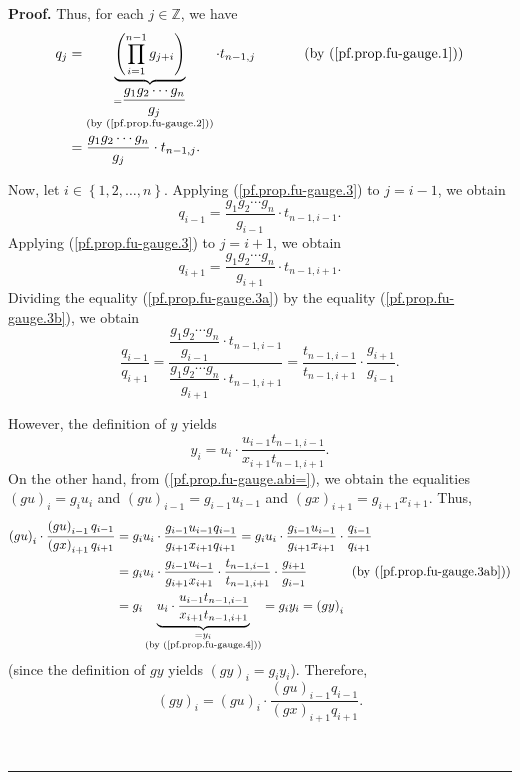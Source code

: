 \documentclass[numbers=enddot,12pt,final,onecolumn,notitlepage]{scrartcl}%
\theoremstyle{definition}
\newenvironment{proof}[1][Proof]{\noindent\textbf{#1.} }{\ \rule{0.5em}{0.5em}}
\let\prodnonlimits\prod
\renewcommand{\prod}{\prodnonlimits\limits}
\newenvironment{verlong}{}{}
\begin{document}
\begin{verlong}
\begin{proof}
Thus, for each $j\in\mathbb{Z}$, we have
\begin{align}
q_{j}  & =\underbrace{\left(  \prod_{i=1}^{n-1}g_{j+i}\right)  }%
_{\substack{=\dfrac{g_{1}g_{2}\cdots g_{n}}{g_{j}}\\\text{(by
(\ref{pf.prop.fu-gauge.2}))}}}\cdot t_{n-1,j}\ \ \ \ \ \ \ \ \ \ \left(
\text{by (\ref{pf.prop.fu-gauge.1})}\right)  \nonumber\\
& =\dfrac{g_{1}g_{2}\cdots g_{n}}{g_{j}}\cdot t_{n-1,j}%
.\label{pf.prop.fu-gauge.3}%
\end{align}


Now, let $i\in\left\{  1,2,\ldots,n\right\}  $. Applying
(\ref{pf.prop.fu-gauge.3}) to $j=i-1$, we obtain%
\begin{equation}
q_{i-1}=\dfrac{g_{1}g_{2}\cdots g_{n}}{g_{i-1}}\cdot t_{n-1,i-1}%
.\label{pf.prop.fu-gauge.3a}%
\end{equation}
Applying (\ref{pf.prop.fu-gauge.3}) to $j=i+1$, we obtain%
\begin{equation}
q_{i+1}=\dfrac{g_{1}g_{2}\cdots g_{n}}{g_{i+1}}\cdot t_{n-1,i+1}%
.\label{pf.prop.fu-gauge.3b}%
\end{equation}
Dividing the equality (\ref{pf.prop.fu-gauge.3a}) by the equality
(\ref{pf.prop.fu-gauge.3b}), we obtain%
\begin{equation}
\dfrac{q_{i-1}}{q_{i+1}}=\dfrac{\dfrac{g_{1}g_{2}\cdots g_{n}}{g_{i-1}}\cdot
t_{n-1,i-1}}{\dfrac{g_{1}g_{2}\cdots g_{n}}{g_{i+1}}\cdot t_{n-1,i+1}}%
=\dfrac{t_{n-1,i-1}}{t_{n-1,i+1}}\cdot\dfrac{g_{i+1}}{g_{i-1}}%
.\label{pf.prop.fu-gauge.3ab}%
\end{equation}


However, the definition of $y$ yields%
\begin{equation}
y_{i}=u_{i}\cdot\dfrac{u_{i-1}t_{n-1,i-1}}{x_{i+1}t_{n-1,i+1}}%
.\label{pf.prop.fu-gauge.4}%
\end{equation}
On the other hand, from (\ref{pf.prop.fu-gauge.abi=}), we obtain the
equalities $\left(  gu\right)  _{i}=g_{i}u_{i}$ and $\left(  gu\right)
_{i-1}=g_{i-1}u_{i-1}$ and $\left(  gx\right)  _{i+1}=g_{i+1}x_{i+1}$. Thus,%
\begin{align*}
\left(  gu\right)  _{i}\cdot\dfrac{\left(  gu\right)  _{i-1}q_{i-1}}{\left(
gx\right)  _{i+1}q_{i+1}}  & =g_{i}u_{i}\cdot\dfrac{g_{i-1}u_{i-1}q_{i-1}%
}{g_{i+1}x_{i+1}q_{i+1}}=g_{i}u_{i}\cdot\dfrac{g_{i-1}u_{i-1}}{g_{i+1}x_{i+1}%
}\cdot\dfrac{q_{i-1}}{q_{i+1}}\\
& =g_{i}u_{i}\cdot\dfrac{g_{i-1}u_{i-1}}{g_{i+1}x_{i+1}}\cdot\dfrac
{t_{n-1,i-1}}{t_{n-1,i+1}}\cdot\dfrac{g_{i+1}}{g_{i-1}}%
\ \ \ \ \ \ \ \ \ \ \left(  \text{by (\ref{pf.prop.fu-gauge.3ab})}\right)  \\
& =g_{i}\underbrace{u_{i}\cdot\dfrac{u_{i-1}t_{n-1,i-1}}{x_{i+1}t_{n-1,i+1}}%
}_{\substack{=y_{i}\\\text{(by (\ref{pf.prop.fu-gauge.4}))}}}=g_{i}%
y_{i}=\left(  gy\right)  _{i}%
\end{align*}
(since the definition of $gy$ yields $\left(  gy\right)  _{i}=g_{i}y_{i}$).
Therefore,
\[
\left(  gy\right)  _{i}=\left(  gu\right)  _{i}\cdot\dfrac{\left(  gu\right)
_{i-1}q_{i-1}}{\left(  gx\right)  _{i+1}q_{i+1}}.
\]



\end{proof}
\end{verlong}
\end{document}
